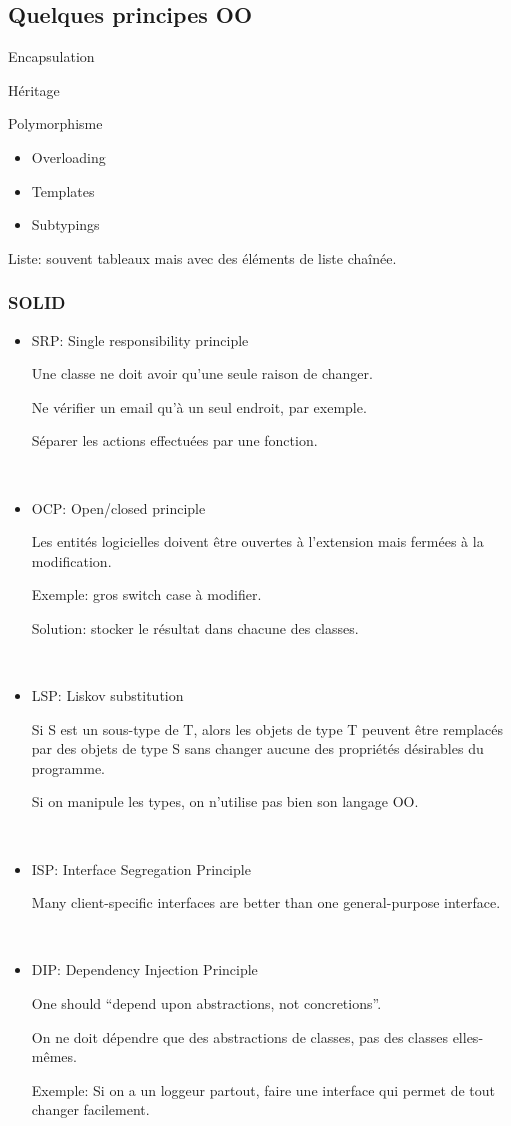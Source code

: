 \documentclass[a4paper,11pt]{article}
\begin{document}
\subsection{Quelques principes OO}

Encapsulation

Héritage

Polymorphisme

\begin{itemize}
\item Overloading
\item Templates
\item Subtypings
\end{itemize}

Liste: souvent tableaux mais avec des éléments de liste chaînée.

\subsubsection{SOLID}

\begin{itemize}
\item SRP: Single responsibility principle

  Une classe ne doit avoir qu'une seule raison de changer.

  Ne vérifier un email qu'à un seul endroit, par exemple.

  Séparer les actions effectuées par une fonction.

  \
\item OCP: Open/closed principle

  Les entités logicielles doivent être ouvertes à l'extension mais fermées à la
  modification.

  Exemple: gros switch case à modifier.

  Solution: stocker le résultat dans chacune des classes.

  \

\item LSP: Liskov substitution

  Si S est un sous-type de T, alors les objets de type T peuvent être remplacés
  par des objets de type S sans changer aucune des propriétés désirables du
  programme.

  Si on manipule les types, on n'utilise pas bien son langage OO.

  \

\item ISP: Interface Segregation Principle

  Many client-specific interfaces are better than one general-purpose interface.

  \

\item DIP: Dependency Injection Principle

  One should ``depend upon abstractions, not concretions''.

  On ne doit dépendre que des abstractions de classes, pas des classes
  elles-mêmes.

  Exemple: Si on a un loggeur partout, faire une interface qui permet de tout
  changer facilement.

\end{itemize}
\end{document}
